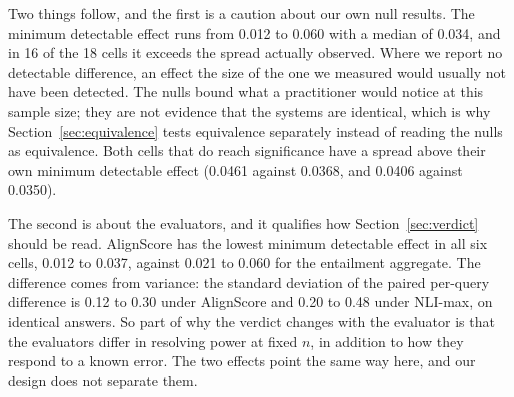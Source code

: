 \documentclass[11pt]{article}
\begin{document}
Two things follow, and the first is a caution about our own null results. The minimum detectable effect runs from 0.012 to 0.060 with a median of 0.034, and in 16 of the 18 cells it exceeds the spread actually observed. Where we report no detectable difference, an effect the size of the one we measured would usually not have been detected. The nulls bound what a practitioner would notice at this sample size; they are not evidence that the systems are identical, which is why Section~\ref{sec:equivalence} tests equivalence separately instead of reading the nulls as equivalence. Both cells that do reach significance have a spread above their own minimum detectable effect (0.0461 against 0.0368, and 0.0406 against 0.0350).

The second is about the evaluators, and it qualifies how Section~\ref{sec:verdict} should be read. AlignScore has the lowest minimum detectable effect in all six cells, 0.012 to 0.037, against 0.021 to 0.060 for the entailment aggregate. The difference comes from variance: the standard deviation of the paired per-query difference is 0.12 to 0.30 under AlignScore and 0.20 to 0.48 under NLI-max, on identical answers. So part of why the verdict changes with the evaluator is that the evaluators differ in resolving power at fixed $n$, in addition to how they respond to a known error. The two effects point the same way here, and our design does not separate them.
\end{document}

